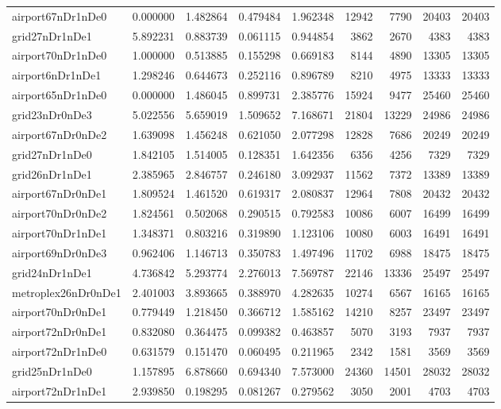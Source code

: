 \begin{longtable}{|l|r|r|r|r|r|r|r|r|}
airport67nDr1nDe0 & 0.000000 & 1.482864 & 0.479484 & 1.962348 & 12942 & 7790 & 20403 & 20403 \\
grid27nDr1nDe1 & 5.892231 & 0.883739 & 0.061115 & 0.944854 & 3862 & 2670 & 4383 & 4383 \\
airport70nDr1nDe0 & 1.000000 & 0.513885 & 0.155298 & 0.669183 & 8144 & 4890 & 13305 & 13305 \\
airport6nDr1nDe1 & 1.298246 & 0.644673 & 0.252116 & 0.896789 & 8210 & 4975 & 13333 & 13333 \\
airport65nDr1nDe0 & 0.000000 & 1.486045 & 0.899731 & 2.385776 & 15924 & 9477 & 25460 & 25460 \\
grid23nDr0nDe3 & 5.022556 & 5.659019 & 1.509652 & 7.168671 & 21804 & 13229 & 24986 & 24986 \\
airport67nDr0nDe2 & 1.639098 & 1.456248 & 0.621050 & 2.077298 & 12828 & 7686 & 20249 & 20249 \\
grid27nDr1nDe0 & 1.842105 & 1.514005 & 0.128351 & 1.642356 & 6356 & 4256 & 7329 & 7329 \\
grid26nDr1nDe1 & 2.385965 & 2.846757 & 0.246180 & 3.092937 & 11562 & 7372 & 13389 & 13389 \\
airport67nDr0nDe1 & 1.809524 & 1.461520 & 0.619317 & 2.080837 & 12964 & 7808 & 20432 & 20432 \\
airport70nDr0nDe2 & 1.824561 & 0.502068 & 0.290515 & 0.792583 & 10086 & 6007 & 16499 & 16499 \\
airport70nDr1nDe1 & 1.348371 & 0.803216 & 0.319890 & 1.123106 & 10080 & 6003 & 16491 & 16491 \\
airport69nDr0nDe3 & 0.962406 & 1.146713 & 0.350783 & 1.497496 & 11702 & 6988 & 18475 & 18475 \\
grid24nDr1nDe1 & 4.736842 & 5.293774 & 2.276013 & 7.569787 & 22146 & 13336 & 25497 & 25497 \\
metroplex26nDr0nDe1 & 2.401003 & 3.893665 & 0.388970 & 4.282635 & 10274 & 6567 & 16165 & 16165 \\
airport70nDr0nDe1 & 0.779449 & 1.218450 & 0.366712 & 1.585162 & 14210 & 8257 & 23497 & 23497 \\
airport72nDr0nDe1 & 0.832080 & 0.364475 & 0.099382 & 0.463857 & 5070 & 3193 & 7937 & 7937 \\
airport72nDr1nDe0 & 0.631579 & 0.151470 & 0.060495 & 0.211965 & 2342 & 1581 & 3569 & 3569 \\
grid25nDr1nDe0 & 1.157895 & 6.878660 & 0.694340 & 7.573000 & 24360 & 14501 & 28032 & 28032 \\
airport72nDr1nDe1 & 2.939850 & 0.198295 & 0.081267 & 0.279562 & 3050 & 2001 & 4703 & 4703 \\

\end{longtable}
